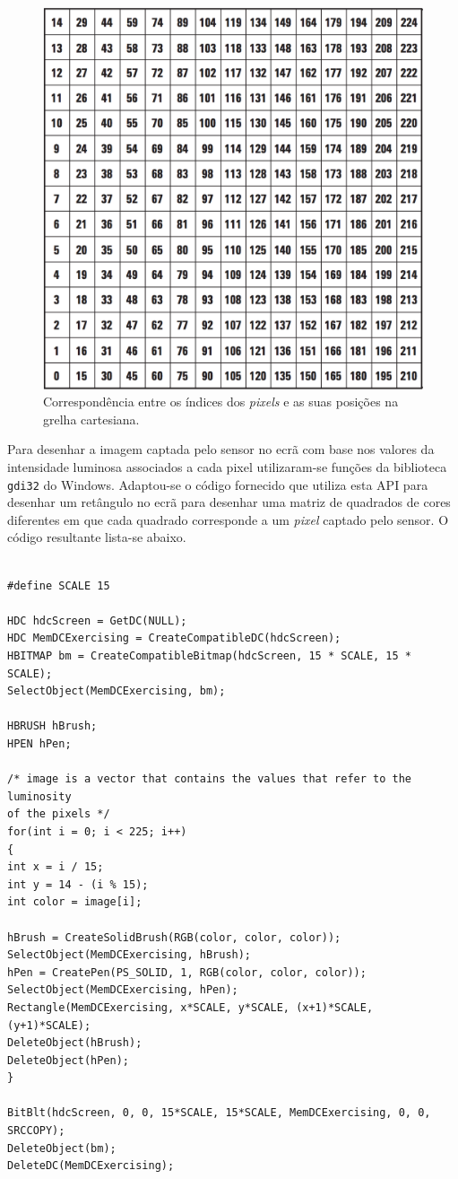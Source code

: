 \documentclass[a4paper,11pt]{article}
\begin{document}
\begin{figure}[htb]
	\centering
	\includegraphics[width=.5\linewidth]{pixels.png}
	\caption{Correspondência entre os índices dos \emph{pixels} e as suas posições na grelha cartesiana.}
	\label{pixels}
\end{figure} 

Para desenhar a imagem captada pelo sensor no ecrã com base nos valores da intensidade luminosa associados a cada pixel utilizaram-se funções da biblioteca \texttt{gdi32} do Windows. Adaptou-se o código fornecido que utiliza esta API para desenhar um retângulo no ecrã para desenhar uma matriz de quadrados de cores diferentes em que cada quadrado corresponde a um \emph{pixel} captado pelo sensor. O código resultante lista-se abaixo.

\begin{verbatim}

#define SCALE 15

HDC hdcScreen = GetDC(NULL);
HDC MemDCExercising = CreateCompatibleDC(hdcScreen);
HBITMAP bm = CreateCompatibleBitmap(hdcScreen, 15 * SCALE, 15 * SCALE);
SelectObject(MemDCExercising, bm);

HBRUSH hBrush;
HPEN hPen;
	
/* image is a vector that contains the values that refer to the luminosity
of the pixels */
for(int i = 0; i < 225; i++)
{
int x = i / 15;
int y = 14 - (i % 15);
int color = image[i];

hBrush = CreateSolidBrush(RGB(color, color, color));
SelectObject(MemDCExercising, hBrush);
hPen = CreatePen(PS_SOLID, 1, RGB(color, color, color));
SelectObject(MemDCExercising, hPen);
Rectangle(MemDCExercising, x*SCALE, y*SCALE, (x+1)*SCALE, (y+1)*SCALE);
DeleteObject(hBrush);
DeleteObject(hPen);
}
	
BitBlt(hdcScreen, 0, 0, 15*SCALE, 15*SCALE, MemDCExercising, 0, 0, SRCCOPY);
DeleteObject(bm);
DeleteDC(MemDCExercising);

\end{verbatim}
\end{document}
